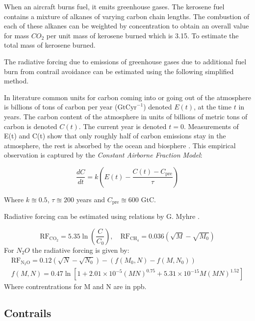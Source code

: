 \documentclass{article}
\begin{document}
When an aircraft burns fuel, it emits greenhouse gases.
The kerosene fuel contains a mixture of alkanes of varying carbon chain lengths.
The combustion of each of these alkanes can be weighted by concentration to obtain an overall
value for mass $CO_2$ per unit mass of kerosene burned which is 3.15.
To estimate the total mass of kerosene burned.

The radiative forcing due to emissions of greenhouse gases due to additional fuel burn from contrail avoidance can be estimated using the following simplified method.

In literature common units for carbon coming into or going out of the atmosphere is billions of tons of carbon per year ($\text{GtCyr}^{-1}$)
denoted $E(t)$, at the time $t$ in years. The carbon content of the atmosphere in units of billions of metric tons of carbon is denoted $C(t)$.
The current year is denoted $t=0$.
Measurements of E(t) and C(t) show that only roughly half of carbon emissions stay in the atmosphere, the rest is absorbed by the ocean and biosphere \cite{co2_modelling}.
This empirical observation is captured by the \emph{Constant Airborne Fraction Model}:

\begin{equation}
    \frac{dC}{dt} = k \left( E(t) - \frac{C(t)-C_\text{pre}}{\tau}\right)
\end{equation}

Where $k \approxeq 0.5$, $\tau \approxeq 200 $ years and $C_\text{pre} \approxeq 600$ GtC.

Radiative forcing can be estimated using relations by G. Myhre \cite{rf_greenhouse}.

\begin{equation}
    \text{RF}_{\text{CO}_2} = 5.35 \ln \left( \frac{C}{C_0} \right), \quad \text{RF}_{\text{CH}_4} = 0.036 \left( \sqrt{M}-\sqrt{M_0} \right)
\end{equation}
For $N_2O$ the radiative forcing is given by:
\begin{eqnarray}
    \text{RF}_{\text{N}_2\text{O}} = 0.12(\sqrt{N} - \sqrt{N_0}) - (f(M_0,N) - f(M,N_0)) \\
    f(M, N) = 0.47 \ln\left[1 + 2.01 \times 10^{-5} (MN)^{0.75} + 5.31 \times 10^{-15} M (MN)^{1.52}\right]
\end{eqnarray}
Where contrentrations for M and N are in ppb.

\subsection{Contrails}
\end{document}
